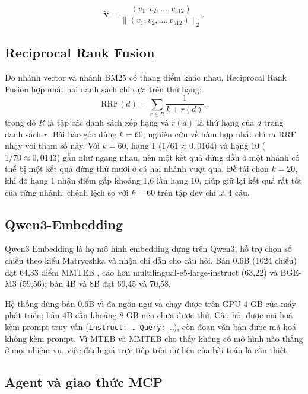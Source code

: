 \begin{equation}
\label{eq:c2_mrl}
\tilde{\mathbf{v}} = \frac{(v_1, v_2, \ldots, v_{512})}{\lVert (v_1, v_2, \ldots, v_{512}) \rVert_2}.
\end{equation}

\subsection{Reciprocal Rank Fusion}
\label{subsec:c2_rrf}

Do nhánh vector và nhánh BM25 có thang điểm khác nhau, Reciprocal Rank Fusion \cite{cormack2009rrf} hợp nhất hai danh sách chỉ dựa trên thứ hạng:
\begin{equation}
\label{eq:c2_rrf}
\mathrm{RRF}(d) = \sum_{r \in R} \frac{1}{k + r(d)},
\end{equation}
trong đó $R$ là tập các danh sách xếp hạng và $r(d)$ là thứ hạng của $d$ trong danh sách $r$. Bài báo gốc dùng $k = 60$; nghiên cứu về hàm hợp nhất \cite{bruch2023fusion} chỉ ra RRF nhạy với tham số này. Với $k = 60$, hạng 1 ($1/61 \approx 0{,}0164$) và hạng 10 ($1/70 \approx 0{,}0143$) gần như ngang nhau, nên một kết quả đứng đầu ở một nhánh có thể bị một kết quả đứng thứ mười ở cả hai nhánh vượt qua. Đề tài chọn $k = 20$, khi đó hạng 1 nhận điểm gấp khoảng 1,6 lần hạng 10, giúp giữ lại kết quả rất tốt của từng nhánh; chênh lệch so với $k = 60$ trên tập dev chỉ là 4 câu.

\subsection{Qwen3-Embedding}
\label{subsec:c2_qwen3}

Qwen3 Embedding \cite{zhang2025qwen3} là họ mô hình embedding dựng trên Qwen3, hỗ trợ chọn số chiều theo kiểu Matryoshka và nhận chỉ dẫn cho câu hỏi. Bản 0.6B (1024 chiều) đạt 64,33 điểm MMTEB \cite{enevoldsen2025mmteb}, cao hơn multilingual-e5-large-instruct \cite{wang2024me5} (63,22) và BGE-M3 \cite{chen2024m3} (59,56); bản 4B và 8B đạt 69,45 và 70,58.

Hệ thống dùng bản 0.6B vì đa ngôn ngữ và chạy được trên GPU 4 GB của máy phát triển; bản 4B cần khoảng 8 GB nên chưa được thử. Câu hỏi được mã hoá kèm prompt truy vấn (\texttt{Instruct: \ldots{} Query: \ldots}), còn đoạn văn bản được mã hoá không kèm prompt. Vì MTEB \cite{muennighoff2023mteb} và MMTEB cho thấy không có mô hình nào thắng ở mọi nhiệm vụ, việc đánh giá trực tiếp trên dữ liệu của bài toán là cần thiết.

\subsection{Agent và giao thức MCP}
\label{subsec:c2_agent_mcp}


